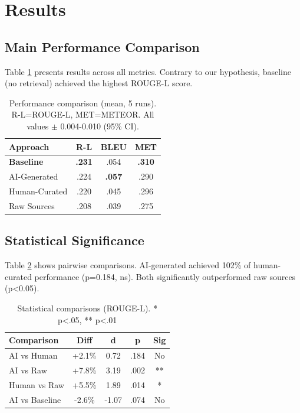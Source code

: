 \documentclass[11pt]{article}
\begin{document}
\section{Results}

\subsection{Main Performance Comparison}

Table \ref{tab:main_results} presents results across all metrics. Contrary to our hypothesis, baseline (no retrieval) achieved the highest ROUGE-L score.

\begin{table}[h]
\centering
\small
\begin{tabular}{lccc}
\toprule
\textbf{Approach} & \textbf{R-L} & \textbf{BLEU} & \textbf{MET} \\
\midrule
\textbf{Baseline} & \textbf{.231} & .054 & \textbf{.310} \\
AI-Generated & .224 & \textbf{.057} & .290 \\
Human-Curated & .220 & .045 & .296 \\
Raw Sources & .208 & .039 & .275 \\
\bottomrule
\end{tabular}
\caption{Performance comparison (mean, 5 runs). R-L=ROUGE-L, MET=METEOR. All values $\pm$ 0.004-0.010 (95\% CI).}
\label{tab:main_results}
\end{table}

\subsection{Statistical Significance}

Table \ref{tab:statistical} shows pairwise comparisons. AI-generated achieved 102\% of human-curated performance (p=0.184, ns). Both significantly outperformed raw sources (p<0.05).

\begin{table}[h]
\centering
\small
\begin{tabular}{lcccc}
\toprule
\textbf{Comparison} & \textbf{Diff} & \textbf{d} & \textbf{p} & \textbf{Sig} \\
\midrule
AI vs Human & +2.1\% & 0.72 & .184 & No \\
AI vs Raw & +7.8\% & 3.19 & .002 & ** \\
Human vs Raw & +5.5\% & 1.89 & .014 & * \\
AI vs Baseline & -2.6\% & -1.07 & .074 & No \\
\bottomrule
\end{tabular}
\caption{Statistical comparisons (ROUGE-L). * p<.05, ** p<.01}
\label{tab:statistical}
\end{table}
\end{document}
